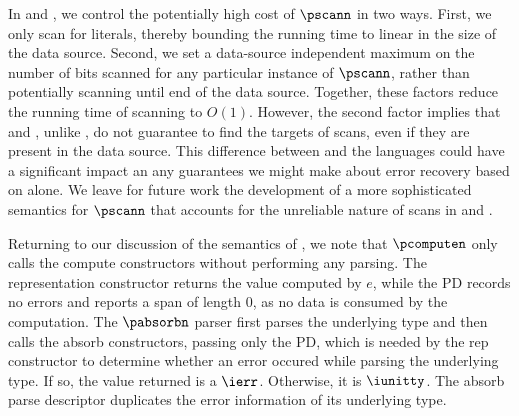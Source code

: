 In \padsc{} and \padsml{}, we control the potentially high cost of
$\pscann$ in two ways. First, we only scan for literals, thereby
bounding the running time to linear in the size of the data source.
Second, we set a data-source independent maximum on the number of bits
scanned for any particular instance of $\pscann$, rather than
potentially scanning until end of the data source. Together, these
factors reduce the running time of scanning to $O(1)$. However, the
second factor implies that \padsc{} and \padsml{}, unlike \ddc{}, do
not guarantee to find the targets of scans, even if they are present
in the data source. This difference between \ddc{} and the \pads{}
languages could have a significant impact an any guarantees we might
make about error recovery based on \ddc{} alone. We leave for future
work the development of a more sophisticated semantics for $\pscann$
that accounts for the unreliable nature of scans in \padsc{} and
\padsml{}.

Returning to our discussion of the semantics of \ddc{}, we note that
$\pcomputen$ only calls the compute constructors without performing
any parsing.  The representation constructor returns the value
computed by $e$, while the PD records no errors and reports a span of
length 0, as no data is consumed by the computation. The $\pabsorbn$
parser first parses the underlying type and then calls the absorb
constructors, passing only the PD, which is needed by the rep
constructor to determine whether an error occured while parsing the
underlying type.  If so, the value returned is a $\ierr$. Otherwise,
it is $\iunitty$.  The absorb parse descriptor duplicates the error
information of its underlying type.

